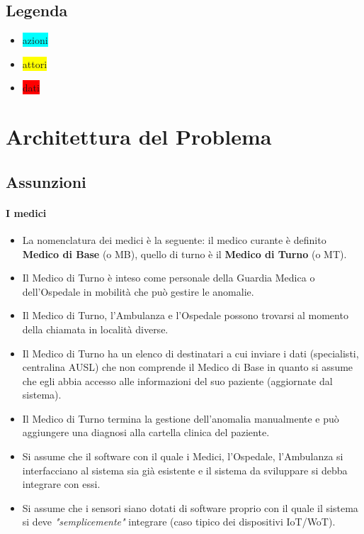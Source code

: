 \documentclass[a4paper,11pt,oneside, table]{article}
\begin{document}
\subsection{Legenda}

\begin{itemize}
  \item \colorbox{cyan}{azioni}
  \item \colorbox{yellow}{attori}
  \item \colorbox{red}{dati}
\end{itemize}

\section{Architettura del Problema}

\subsection{Assunzioni}

\paragraph{I medici}
\begin{itemize}
  \item La nomenclatura dei medici \`e la seguente: il medico curante \`e definito \textbf{Medico di Base} (o MB), quello di turno \`e il \textbf{Medico di Turno} (o MT).
  \item Il Medico di Turno \`e inteso come personale della Guardia Medica o dell'Ospedale in mobilit\`a che pu\`o gestire le anomalie.
  \item Il Medico di Turno, l'Ambulanza e l'Ospedale possono trovarsi al momento della chiamata in localit\`a diverse.
  \item Il Medico di Turno ha un elenco di destinatari a cui inviare i dati (specialisti, centralina AUSL) che non comprende il Medico di Base in quanto si assume che egli abbia accesso alle informazioni del suo paziente (aggiornate dal sistema).
  \item Il Medico di Turno termina la gestione dell'anomalia manualmente e pu\`o aggiungere una diagnosi alla cartella clinica del paziente.
  \item Si assume che il software con il quale i Medici, l'Ospedale, l'Ambulanza si interfacciano al sistema sia gi\`a esistente e il sistema da sviluppare si debba integrare con essi.
  \item Si assume che i sensori siano dotati di software proprio con il quale il sistema si deve \textit{"semplicemente"} integrare (caso tipico dei dispositivi IoT/WoT).
\end{itemize}
\end{document}
